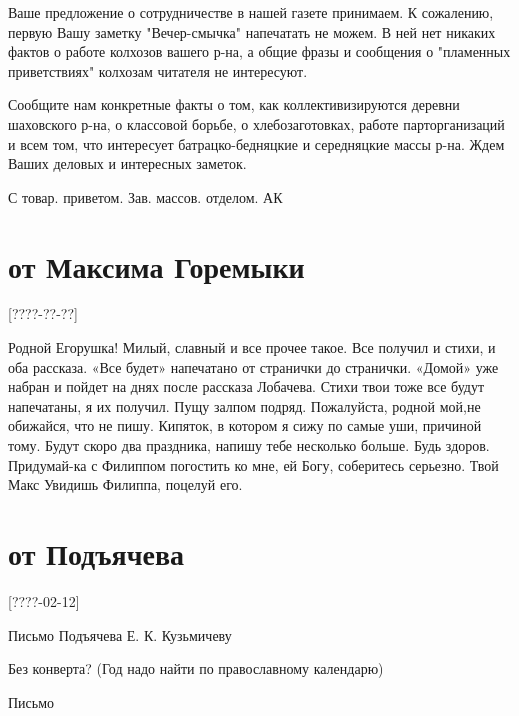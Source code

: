 \documentclass[]{memoir}
\begin{document}
Ваше предложение о сотрудничестве в нашей газете принимаем. К сожалению, первую Вашу заметку "Вечер-смычка" напечатать не можем. В ней нет никаких фактов о работе колхозов вашего р-на, а общие фразы и сообщения о "пламенных приветствиях" колхозам читателя не интересуют.

Сообщите нам конкретные факты о том, как коллективизируются деревни шаховского р-на, о классовой борьбе, о хлебозаготовках, работе парторганизаций и всем том, что интересует батрацко-бедняцкие и середняцкие массы р-на.
Ждем Ваших деловых и интересных заметок.

С товар. приветом.
Зав. массов. отделом. АК

\section{от Максима Горемыки}

[????-??-??]

                                Родной Егорушка!
Милый, славный и все прочее такое.
Все получил и стихи, и оба рассказа. «Все будет» напечатано от странички до странички. «Домой» уже набран и пойдет на днях после рассказа Лобачева. Стихи твои тоже все будут напечатаны, я их получил. Пущу залпом подряд. Пожалуйста, родной мой,не обижайся, что не пишу. Кипяток, в котором я сижу по самые уши, причиной тому. Будут скоро два праздника, напишу тебе несколько больше. Будь здоров.
   Придумай-ка с Филиппом погостить ко мне, ей Богу, соберитесь серьезно.
                    Твой Макс
Увидишь Филиппа, поцелуй его.


\section{от Подъячева}

[????-02-12]

Письмо Подъячева Е. К. Кузьмичеву

Без конверта? (Год надо найти по православному календарю)

Письмо
\end{document}
